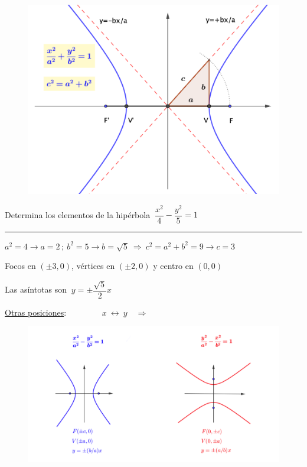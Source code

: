 \begin{figure}[H]
	\centering
	\includegraphics[width=.75\textwidth]{img-conicas/conicas30.png}
	\end{figure}


\begin{miejemplo}

Determina los elementos de la hipérbola $\ \dfrac{x^2}4-\dfrac{y^2}5=1$

\rule{250pt}{0.1pt}

\vspace{2mm}
$a^2=4 \to a=2\, ; \ b^2=5\to b=	\sqrt 5 \ \Rightarrow \ c^2=a^2+b^2=9 \to c=3$

\vspace{2mm}Focos en $(\pm 3, 0)$, vértices en $(\pm 2,0)$ y centro en $(0,0)$

\vspace{2mm}Las asíntotas son $ \ y=\pm\dfrac{\sqrt 5}{2}x$
\end{miejemplo}




\vspace{4mm} \underline{Otras posiciones}:
$\qquad \qquad x\ \leftrightarrow \ y \quad \Rightarrow \qquad $ 


\begin{figure}[H]
	\centering
	\includegraphics[width=.95\textwidth]{img-conicas/conicas13.png}
	\end{figure}

